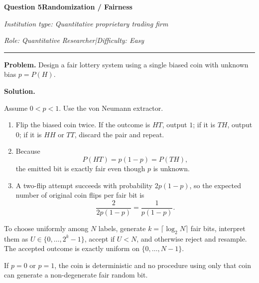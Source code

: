 \documentclass[11pt,letterpaper,openany]{book}
\newcommand{\InterviewQuestionHeader}[5]{%
  \vspace{1.0em}%
  {\large\bfseries #1\enspace #4\par}%
  {\small\itshape Institution type: #2\par}%
  {\small\itshape Role: #3\enspace |\enspace Difficulty: #5\par}%
  \vspace{0.25em}\hrule\vspace{0.45em}%
}
\begin{document}
\InterviewQuestionHeader{Question 5}{Quantitative proprietary trading firm}{Quantitative Researcher}{Randomization / Fairness}{Easy}
\textbf{Problem.} Design a fair lottery system using a single biased coin with unknown bias \(p = P(H)\).

\textbf{Solution.}


Assume \(0<p<1\). Use the von Neumann extractor.

\begin{enumerate}
\item Flip the biased coin twice. If the outcome is \(HT\), output \(1\); if it is \(TH\), output \(0\); if it is \(HH\) or \(TT\), discard the pair and repeat.
\item Because
\[
P(HT)=p(1-p)=P(TH),
\]
the emitted bit is exactly fair even though \(p\) is unknown.
\item A two-flip attempt succeeds with probability \(2p(1-p)\), so the expected number of original coin flips per fair bit is
\[
\frac{2}{2p(1-p)}=\frac{1}{p(1-p)}.
\]
\end{enumerate}

To choose uniformly among \(N\) labels, generate \(k=\lceil\log_2N\rceil\) fair bits, interpret them as \(U\in\{0,\dots,2^k-1\}\), accept if \(U<N\), and otherwise reject and resample. The accepted outcome is exactly uniform on \(\{0,\dots,N-1\}\).

If \(p=0\) or \(p=1\), the coin is deterministic and no procedure using only that coin can generate a non-degenerate fair random bit.
\end{document}
